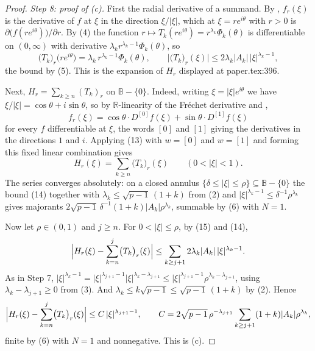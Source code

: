 \begin{proof}
\emph{Step 8: proof of (c).}  First the radial derivative of a summand.  By
, $f_r(\xi)$ is the derivative of $f$ at $\xi$ in the direction
$\xi/|\xi|$, which at $\xi=re^{i\theta}$ with $r>0$ is
$\partial\bigl(f(re^{i\theta})\bigr)/\partial r$.  By (4) the function
$r\mapsto T_k(re^{i\theta})=r^{\lambda_k}\Phi_k(\theta)$ is differentiable on
$(0,\infty)$ with derivative $\lambda_kr^{\lambda_k-1}\Phi_k(\theta)$, so
\begin{equation}\tag{14}
  \bigl(T_k\bigr)_r\bigl(re^{i\theta}\bigr)
  =\lambda_k\,r^{\lambda_k-1}\Phi_k(\theta),\qquad
  \bigl|\bigl(T_k\bigr)_r(\xi)\bigr|\le2\lambda_k|A_k|\,|\xi|^{\lambda_k-1},
\end{equation}
the bound by (5).  This is the expansion of $H_r$ displayed at paper.tex:396.

Next, $H_r=\sum_{k\ge n}(T_k)_r$ on $\mathbb{B}-\{0\}$.  Indeed, writing
$\xi=|\xi|e^{i\theta}$ we have $\xi/|\xi|=\cos\theta+i\sin\theta$, so by
$\mathbb{R}$-linearity of the Fréchet derivative and ,
\[
  f_r(\xi)=\cos\theta\cdot D^{[0]}f(\xi)+\sin\theta\cdot D^{[1]}f(\xi)
\]
for every $f$ differentiable at $\xi$, the words $[0]$ and $[1]$ giving the
derivatives in the directions $1$ and $i$.  Applying (13) with $w=[0]$ and
$w=[1]$ and forming this fixed linear combination gives
\begin{equation}\tag{15}
  H_r(\xi)=\sum_{k\ge n}\bigl(T_k\bigr)_r(\xi)\qquad(0<|\xi|<1).
\end{equation}
The series converges absolutely: on a closed annulus
$\{\delta\le|\xi|\le\rho\}\subseteq\mathbb{B}-\{0\}$ the bound (14) together
with $\lambda_k\le\sqrt{p-1}\,(1+k)$ from (2) and
$|\xi|^{\lambda_k-1}\le\delta^{-1}\rho^{\lambda_k}$ gives majorants
$2\sqrt{p-1}\,\delta^{-1}(1+k)|A_k|\rho^{\lambda_k}$, summable by (6) with
$N=1$.

Now let $\rho\in(0,1)$ and $j\ge n$.  For $0<|\xi|\le\rho$, by (15) and (14),
\[
  \Bigl|H_r(\xi)-\sum_{k=n}^{j}\bigl(T_k\bigr)_r(\xi)\Bigr|
  \le\sum_{k\ge j+1}2\lambda_k|A_k|\,|\xi|^{\lambda_k-1}.
\]
As in Step 7, $|\xi|^{\lambda_k-1}=|\xi|^{\lambda_{j+1}-1}
|\xi|^{\lambda_k-\lambda_{j+1}}\le|\xi|^{\lambda_{j+1}-1}
\rho^{\lambda_k-\lambda_{j+1}}$, using $\lambda_k-\lambda_{j+1}\ge0$ from (3).
And $\lambda_k\le k\sqrt{p-1}\le\sqrt{p-1}\,(1+k)$ by (2).  Hence
\[
  \Bigl|H_r(\xi)-\sum_{k=n}^{j}\bigl(T_k\bigr)_r(\xi)\Bigr|
  \le C\,|\xi|^{\lambda_{j+1}-1},\qquad
  C=2\sqrt{p-1}\,\rho^{-\lambda_{j+1}}\sum_{k\ge j+1}(1+k)|A_k|\rho^{\lambda_k},
\]
finite by (6) with $N=1$ and nonnegative.  This is (c).


\end{proof}
